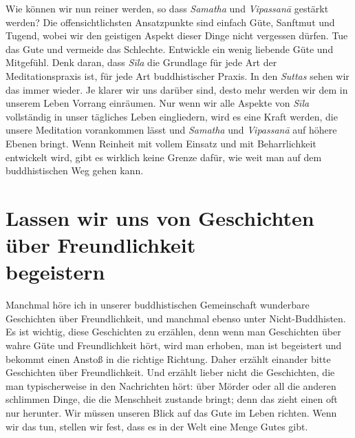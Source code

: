 \documentclass[12pt,openany]{book}
\begin{document}
Wie können wir nun reiner werden, so dass \textit{Samatha} und \textit{Vipas\-sanā} gestärkt werden? Die offensichtlichsten Ansatzpunkte sind einfach Güte, Sanftmut und Tugend, wobei wir den geistigen Aspekt dieser Dinge nicht vergessen dürfen. Tue das Gute und vermeide das Schlechte. Entwickle ein wenig liebende Güte und Mitgefühl. Denk daran, dass \textit{Sīla} die Grundlage für jede Art der Meditationspraxis ist, für jede Art buddhistischer Praxis. In den \textit{Suttas} sehen wir das immer wieder. Je klarer wir uns da\-rüber sind, desto mehr werden wir dem in unserem Leben Vorrang einräumen. Nur wenn wir alle Aspekte von \textit{Sīla} vollständig in unser tägliches Leben eingliedern, wird es eine Kraft werden, die unsere Meditation vorankommen lässt und \textit{Samatha} und \textit{Vipas\-sanā} auf höhere Ebenen bringt. Wenn Reinheit mit vollem Einsatz und mit Beharrlichkeit entwickelt wird, gibt es wirklich keine Grenze dafür, wie weit man auf dem buddhistischen Weg gehen kann.

\section*{Lassen wir uns von Geschichten über Freundlichkeit \protect\\ begeistern}

Manchmal höre ich in unserer buddhistischen Gemeinschaft wunderbare Geschichten über Freundlichkeit, und manchmal ebenso unter Nicht-Buddhisten. Es ist wichtig, diese Geschichten zu erzählen, denn wenn man Geschichten über wahre Güte und Freundlichkeit hört, wird man erhoben, man ist begeistert und bekommt einen Anstoß in die richtige Richtung. Daher erzählt einander bitte Geschichten über Freundlichkeit. Und erzählt lieber nicht die Geschichten, die man typischerweise in den Nachrichten hört: über Mörder oder all die anderen schlimmen Dinge, die die Menschheit zustande bringt; denn das zieht einen oft nur he\-runter. Wir müssen unseren Blick auf das Gute im Leben richten. Wenn wir das tun, stellen wir fest, dass es in der Welt eine Menge Gutes gibt.
\end{document}
